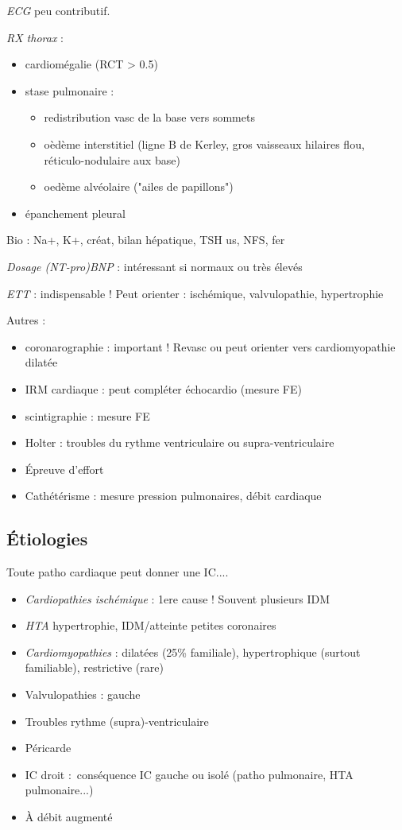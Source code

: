 \textit{ECG}  peu contributif.

\textit{RX thorax}  :
\begin{itemize}
  \item cardiomégalie (\gls{RCT} > 0.5)
  \item stase pulmonaire :
    \begin{itemize}
      \item redistribution vasc de la base vers sommets
      \item oèdème interstitiel (ligne B de Kerley, gros vaisseaux hilaires flou,
        réticulo-nodulaire aux base)
      \item oedème alvéolaire ("ailes de papillons")
    \end{itemize}
  \item épanchement pleural
\end{itemize}

Bio : Na+, K+, créat, bilan hépatique, TSH us, NFS, fer

\textit{Dosage (NT-pro)BNP}  : intéressant si normaux ou très élevés

\textit{ETT} : indispensable ! Peut orienter : ischémique, valvulopathie,
hypertrophie

Autres :
\begin{itemize}
  \item coronarographie : important ! Revasc ou peut orienter vers cardiomyopathie
    dilatée
  \item IRM cardiaque : peut compléter échocardio (mesure \gls{FE})
  \item scintigraphie : mesure FE
  \item Holter : troubles du rythme ventriculaire ou supra-ventriculaire
  \item Épreuve d'effort
  \item Cathétérisme : mesure pression pulmonaires, débit cardiaque
\end{itemize}

\subsection{Étiologies}
Toute patho cardiaque peut donner une IC....

\begin{itemize}
  \item \textit{Cardiopathies ischémique} : 1ere cause ! Souvent plusieurs IDM
  \item \textit{HTA} \thus hypertrophie, IDM/atteinte petites coronaires
  \item \textit{Cardiomyopathies} : dilatées (25\% familiale), hypertrophique (surtout
    familiable), restrictive (rare)
  \item Valvulopathies : gauche
  \item Troubles rythme (supra)-ventriculaire
  \item Péricarde
  \item IC droit : conséquence IC gauche ou isolé (patho pulmonaire, HTA
    pulmonaire...)
  \item À débit augmenté
\end{itemize}

